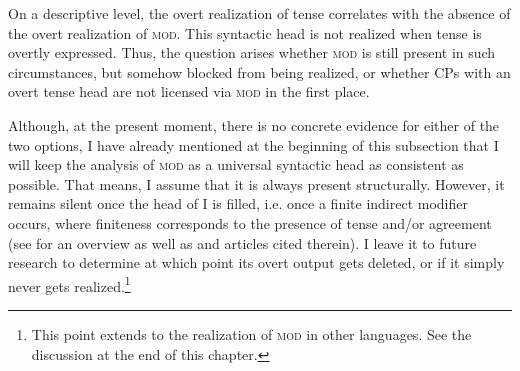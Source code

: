 On a descriptive level, the overt realization of tense correlates with the absence of the overt realization of \textsc{mod}. This syntactic head is not realized when tense is overtly expressed. Thus, the question arises whether \textsc{mod} is still present in such circumstances, but somehow blocked from being realized, or whether CPs with an overt tense head are not licensed via \textsc{mod} in the first place.

Although, at the present moment, there is no concrete evidence for either of the two options, I have already mentioned at the beginning of this subsection that I will keep the analysis of \textsc{mod} as a universal syntactic head as consistent as possible. That means, I assume that it is always present structurally. However, it remains silent once the head of I is filled, i.e. once a finite indirect modifier occurs, where finiteness corresponds to the presence of tense and/or agreement (see \citealt[103–108]{landau:2013:control} for an overview as well as \citealt{nikolaeva:2007:intro} and articles cited therein). I leave it to future research to determine at which point its overt output gets deleted, or if it simply never gets realized.\footnote{This point extends to the realization of \textsc{mod} in other languages. See the discussion at the end of this chapter.} 


